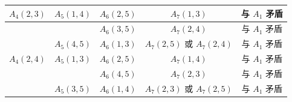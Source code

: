 \documentclass[a4paper,11pt]{article}
\begin{document}
\begin{enumerate}
\begin{center}
\begin{tabular}{|c|c|c|c|c|}
\hline
$A_4(2,3)$ & $A_5(1,4)$ & $A_6(2,5)$ & $A_7(1,3)$ & 与 $A_1$ 矛盾\\
\hline
 &  & $A_6(3,5)$ & $A_7(2,4)$ & 与 $A_1$ 矛盾\\
\hline
 & $A_5(4,5)$ & $A_6(1,3)$ & $A_7(2,5)$ 或 $A_7(2,4)$ & 与 $A_1$ 矛盾\\
\hline
$A_4(2,4)$ & $A_5(1,3)$ & $A_6(2,5)$ & $A_7(1,4)$ & 与 $A_1$ 矛盾\\
\hline
 &  & $A_6(4,5)$ & $A_7(2,3)$ & 与 $A_1$ 矛盾\\
\hline
 & $A_5(3,5)$ & $A_6(1,4)$ & $A_7(2,3)$ 或 $A_7(2,5)$ & 与 $A_1$ 矛盾\\
\hline
\end{tabular}
\end{center}
\solend
\fi

\ansspace*[7]

\end{enumerate}
\end{document}
